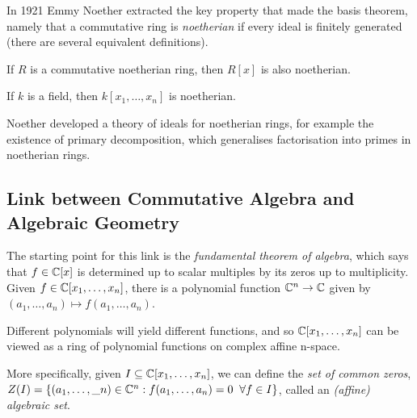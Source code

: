 \documentclass[10pt,a4paper]{article}
\begin{document}
In 1921 Emmy Noether extracted the key property that made the basis theorem, namely that a commutative ring is \emph{noetherian} if every ideal is finitely generated (there are several equivalent definitions).

\begin{theorem}
If $R$ is a commutative noetherian ring, then $R[x]$ is also noetherian.
\end{theorem}
\begin{corollary}
If $k$ is a field, then $k[x_1, \ldots, x_n]$ is noetherian.
\end{corollary}

Noether developed a theory of ideals for noetherian rings, for example the existence of primary decomposition, which generalises factorisation into primes in noetherian rings.

\subsection*{Link between Commutative Algebra and Algebraic Geometry}
The starting point for this link is the \emph{fundamental theorem of algebra}, which says that $f \in \mathbb{C}[x]$ is determined up to scalar multiples by its zeros up to multiplicity. Given $f \in \mathbb{C}[x_1, \ldots, x_n]$, there is a polynomial function $\mathbb{C}^n \to \mathbb{C}$ given by $(a_1, \ldots, a_n) \mapsto f(a_1, \ldots, a_n)$.

Different polynomials will yield different functions, and so $\mathbb{C}[x_1, \ldots, x_n]$ can be viewed as a ring of polynomial functions on complex affine n-space.

More specifically, given $I \subseteq \mathbb{C}[x_1, \ldots, x_n]$, we can define the \emph{set of common zeros}, $Z(I) = \{(a_1, \ldots, \_n) \in \C^n : f(a_1, \ldots, a_n) = 0 \; \forall f \in I\}$, called an \emph{(affine) algebraic set}.
\end{document}
